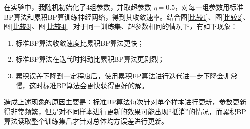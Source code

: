 \documentclass{ctexart}
\begin{document}
	在实验中，我随机初始化了4组参数，并取超参数 $\eta=0.5$，对每一组参数用标准BP算法和累积BP算训练神经网络，得到其收敛速率。结合图\ref{比较1}、图\ref{比较2}、图\ref{比较3}、图\ref{比较4}，对于同一训练集、超参数相同的情况下，有如下现象：
	
	\begin{enumerate}
		\item 标准BP算法收敛速度比累积BP算法更快；
		\item 标准BP算法在迭代时抖动比累积BP算法更剧烈；
		\item 累积误差下降到一定程度后，使用累积BP算法进行迭代进一步下降会非常慢，这时标准BP算法会更快获得更好的解。
	\end{enumerate}
	
	造成上述现象的原因主要是：标准BP算法每次针对单个样本进行更新，参数更新得非常频繁，但是对不同样本进行更新的效果可能出现“抵消”的情况，而累积BP算法读取整个训练集后才针对总体均方误差进行更新。
	
\end{document}
